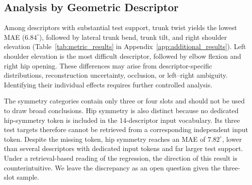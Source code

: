 \begin{table}[t]
    \centering
    \caption{Teacher-forced regression by geometry-QA type.}
    \label{tab:path_results}
\end{table}

\subsection{Analysis by Geometric Descriptor}
\label{sec:metric_results}

Among descriptors with substantial test support, trunk twist yields the lowest MAE ($6.84^\circ$), followed by lateral trunk bend, trunk tilt, and right shoulder elevation (Table~\ref{tab:metric_results} in Appendix~\ref{app:additional_results}).
Left shoulder elevation is the most difficult descriptor, followed by elbow flexion and right hip opening.
These differences may arise from descriptor-specific distributions, reconstruction uncertainty, occlusion, or left--right ambiguity.
Identifying their individual effects requires further controlled analysis.

The symmetry categories contain only three or four slots and should not be used to draw broad conclusions.
Hip symmetry is also distinct because no dedicated hip-symmetry token is included in the 14-descriptor input vocabulary.
Its three test targets therefore cannot be retrieved from a corresponding independent input token.
Despite the missing token, hip symmetry reaches an MAE of $7.82^\circ$, lower than several descriptors with dedicated input tokens and far larger test support.
Under a retrieval-based reading of the regression, the direction of this result is counterintuitive.
We leave the discrepancy as an open question given the three-slot sample.


